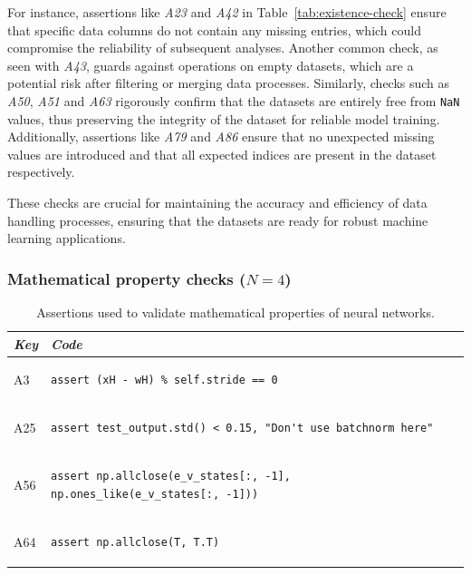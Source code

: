 For instance, assertions like \emph{A23} and \emph{A42} in Table~\ref{tab:existence-check} ensure that specific data columns do not contain any missing entries, which could compromise the reliability of subsequent analyses. Another common check, as seen with \emph{A43}, guards against operations on empty datasets, which are a potential risk after filtering or merging data processes. Similarly, checks such as \emph{A50}, \emph{A51} and \emph{A63} rigorously confirm that the datasets are entirely free from \texttt{NaN} values, thus preserving the integrity of the dataset for reliable model training. Additionally, assertions like \emph{A79} and \emph{A86} ensure that no unexpected missing values are introduced and that all expected indices are present in the dataset respectively.

These checks are crucial for maintaining the accuracy and efficiency of data handling processes, ensuring that the datasets are ready for robust machine learning applications.

\subsubsection{Mathematical property checks ($N = 4$)}

\begin{table}
\centering
\begin{tabular}{@{}m{} m{}@{}}
\toprule
\emph{\textbf{Key}}&
\emph{\textbf{Code}}\\
\midrule

A3 &
\begin{lstlisting}
assert (xH - wH) % self.stride == 0
\end{lstlisting}\\

A25 &
\begin{lstlisting}
assert test_output.std() < 0.15, "Don't use batchnorm here"
\end{lstlisting}\\

A56 &
\begin{lstlisting}
assert np.allclose(e_v_states[:, -1], np.ones_like(e_v_states[:, -1]))
\end{lstlisting}\\

A64 &
\begin{lstlisting}
assert np.allclose(T, T.T)
\end{lstlisting}\\
\end{tabular}
\caption{Assertions used to validate mathematical properties of neural networks.}
\label{tab:maths-check}
\end{table}

